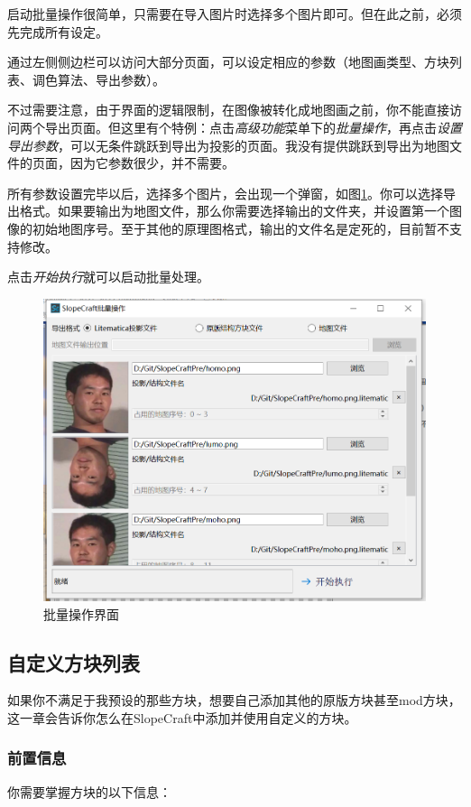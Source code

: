 \documentclass[UTF8]{ctexart}
\begin{document}
启动批量操作很简单，只需要在导入图片时选择多个图片即可。但在此之前，必须先完成所有设定。

通过左侧侧边栏可以访问大部分页面，可以设定相应的参数（地图画类型、方块列表、调色算法、导出参数）。

不过需要注意，由于界面的逻辑限制，在图像被转化成地图画之前，你不能直接访问两个导出页面。但这里有个特例：点击\textit{高级功能}菜单下的\textit{批量操作}，再点击\textit{设置导出参数}，可以无条件跳跃到导出为投影的页面。我没有提供跳跃到导出为地图文件的页面，因为它参数很少，并不需要。

所有参数设置完毕以后，选择多个图片，会出现一个弹窗，如图\ref*{BatchUi}。你可以选择导出格式。如果要输出为地图文件，那么你需要选择输出的文件夹，并设置第一个图像的初始地图序号。至于其他的原理图格式，输出的文件名是定死的，目前暂不支持修改。

点击\textit{开始执行}就可以启动批量处理。

\begin{figure}[htbp]
    \centering
    \includegraphics[width=15cm]{Img12_BatchOp.png}
    \caption{批量操作界面}
    \label{BatchUi}
\end{figure}

\subsection{自定义方块列表}
如果你不满足于我预设的那些方块，想要自己添加其他的原版方块甚至mod方块，这一章会告诉你怎么在SlopeCraft中添加并使用自定义的方块。

\subsubsection{前置信息}
你需要掌握方块的以下信息：
\end{document}
